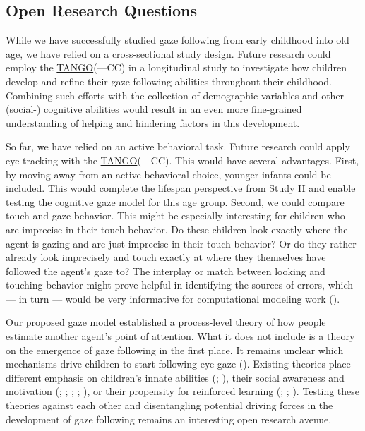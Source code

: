 \documentclass[
]{scrbook}
\begin{document}
\subsection{Open Research Questions}\label{open-research-questions}

While we have successfully studied gaze following from early childhood into old age, we have relied on a cross-sectional study design. Future research could employ the \hyperref[acronyms_TANGO]{TANGO}(---CC) in a longitudinal study to investigate how children develop and refine their gaze following abilities throughout their childhood. Combining such efforts with the collection of demographic variables and other (social-) cognitive abilities would result in an even more fine-grained understanding of helping and hindering factors in this development.

So far, we have relied on an active behavioral task. Future research could apply eye tracking with the \hyperref[acronyms_TANGO]{TANGO}(---CC). This would have several advantages. First, by moving away from an active behavioral choice, younger infants could be included. This would complete the lifespan perspective from \hyperref[studyII]{Study II} and enable testing the cognitive gaze model for this age group. Second, we could compare touch and gaze behavior. This might be especially interesting for children who are imprecise in their touch behavior. Do these children look exactly where the agent is gazing and are just imprecise in their touch behavior? Or do they rather already look imprecisely and touch exactly at where they themselves have followed the agent's gaze to? The interplay or match between looking and touching behavior might prove helpful in identifying the sources of errors, which --- in turn --- would be very informative for computational modeling work ().

Our proposed gaze model established a process-level theory of how people estimate another agent's point of attention. What it does not include is a theory on the emergence of gaze following in the first place. It remains unclear which mechanisms drive children to start following eye gaze (). Existing theories place different emphasis on children's innate abilities (; ), their social awareness and motivation (; ; ; ; ), or their propensity for reinforced learning (; ; ). Testing these theories against each other and disentangling potential driving forces in the development of gaze following remains an interesting open research avenue.
\end{document}
